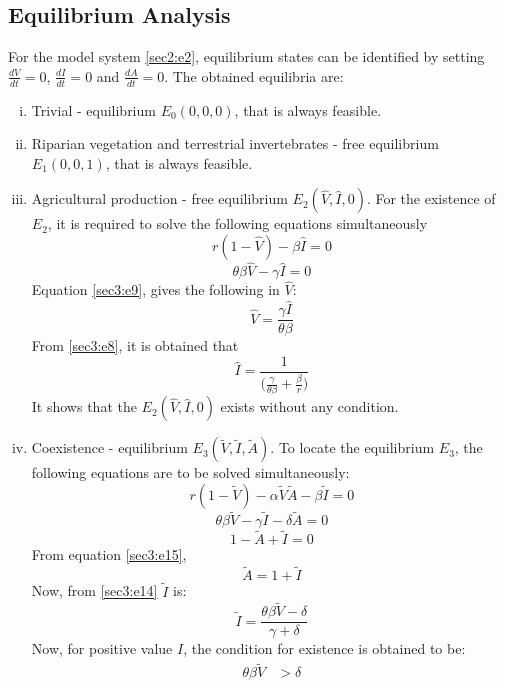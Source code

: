 \documentclass[12pt,a4wide]{report}
\numberwithin{equation}{chapter}
\numberwithin{theorem}{chapter}
\begin{document}
\subsection{Equilibrium Analysis}
For the model system \eqref{sec2:e2}, equilibrium states can be identified by setting $\frac{dV}{dt}=0$, $\frac{dI}{dt}=0$ and $\frac{dA}{dt}=0$. The obtained equilibria are:
\begin{enumerate}[i)]
\item Trivial - equilibrium $E_0(0,0,0)$, that is always feasible.
\item Riparian vegetation and terrestrial invertebrates - free equilibrium $E_1(0,0,1)$, that is always feasible.
\item Agricultural production - free equilibrium $E_2(\hat V, \hat I, 0)$. For the existence of $E_2$, it is required to solve the following equations simultaneously
\begin{equation}\label{sec3:e8}
r (1- \hat V)- \beta \hat I =0
\end{equation}
\begin{equation}\label{sec3:e9}
\theta \beta  \hat V - \gamma \hat I =0
\end{equation}
Equation \eqref{sec3:e9}, gives the following in $\hat V$:
\begin{equation}\label{sec3:e12}
\hat V = \frac{\gamma \hat I}{\theta \beta}
\end{equation}
From \eqref{sec3:e8}, it is obtained that
\begin{equation}\label{sec3:e10}
\hat I=\frac{1}{\bigg( \frac{\gamma}{\theta \beta} + \frac{\beta}{r}\bigg)}
\end{equation}
It shows that the $E_2(\hat V, \hat I, 0)$ exists without any condition.
\item Coexistence - equilibrium $E_3 (\tilde V, \tilde I, \tilde A)$. To locate the equilibrium $E_3$, the following equations are to be solved simultaneously:
\begin{equation}\label{sec3:e13}
r(1- \tilde V)-\alpha \tilde V \tilde A - \beta \tilde I=0
\end{equation}
\begin{equation}\label{sec3:e14}
\theta \beta \tilde V - \gamma \tilde I - \delta \tilde A=0
\end{equation}
\begin{equation}\label{sec3:e15}
1- \tilde A+\tilde I =0
\end{equation}
From equation \eqref{sec3:e15},
\begin{equation}\label{sec3:e16}
\tilde A=1+\tilde I
\end{equation}
Now, from \eqref{sec3:e14} $\tilde I$ is:
\begin{equation}\label{sec3:e16}
\tilde I = \frac{\theta \beta \tilde V-\delta}{\gamma +\delta}
\end{equation}
Now, for positive value $I$, the condition for existence is obtained to be:
\begin{align}\label{sec3:e17}
\theta \beta \tilde V &>\delta
\end{align}


\end{enumerate}
\end{document}
